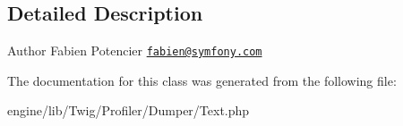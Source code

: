 \subsection{Detailed Description}
\begin{DoxyAuthor}{Author}
Fabien Potencier \href{mailto:fabien@symfony.com}{\tt fabien@symfony.\+com} 
\end{DoxyAuthor}


The documentation for this class was generated from the following file\+:\begin{DoxyCompactItemize}
\item 
engine/lib/\+Twig/\+Profiler/\+Dumper/Text.\+php\end{DoxyCompactItemize}
